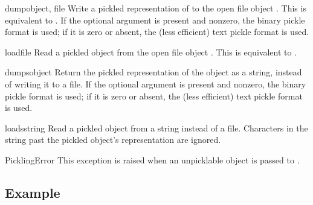 \begin{funcdesc}{dump}{object, file}
Write a pickled representation of  to the open file object
.  This is equivalent to
.
If the optional  argument is present and nonzero, the binary
pickle format is used; if it is zero or absent, the (less efficient)
text pickle format is used.
\end{funcdesc}

\begin{funcdesc}{load}{file}
Read a pickled object from the open file object .  This is
equivalent to .
\end{funcdesc}

\begin{funcdesc}{dumps}{object}
Return the pickled representation of the object as a string, instead
of writing it to a file.  If the optional  argument is
present and nonzero, the binary pickle format is used; if it is zero
or absent, the (less efficient) text pickle format is used.
\end{funcdesc}

\begin{funcdesc}{loads}{string}
Read a pickled object from a string instead of a file.  Characters in
the string past the pickled object's representation are ignored.
\end{funcdesc}

\begin{excdesc}{PicklingError}
This exception is raised when an unpicklable object is passed to
.
\end{excdesc}


\begin{seealso}



\end{seealso}


\subsection{Example \label{pickle-example}}

